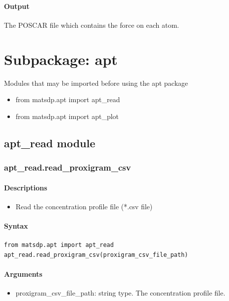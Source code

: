 \documentclass[12pt]{book}
\begin{document}
\subsubsection{Output}

The POSCAR file which contains the force on each atom.

\chapter{Subpackage: apt}

Modules that may be imported before using the apt package
\begin{itemize}
\item from matsdp.apt import apt\_read
\item from matsdp.apt import apt\_plot
\end{itemize}

\section{apt\_read module}

\subsection{apt\_read.read\_proxigram\_csv}

\subsubsection{Descriptions}
\begin{itemize}
\item Read the concentration profile file (*.csv file)
\end{itemize}

\subsubsection{Syntax}
\begin{lstlisting}
from matsdp.apt import apt_read
apt_read.read_proxigram_csv(proxigram_csv_file_path)
\end{lstlisting}

\subsubsection{Arguments}

\begin{itemize}
\item proxigram\_csv\_file\_path: string type. The concentration profile file.
\end{itemize}
\end{document}
